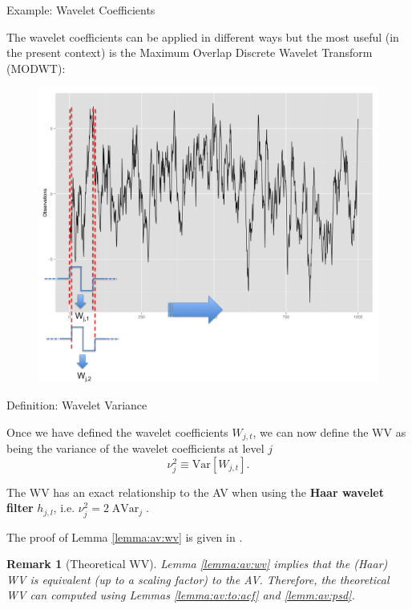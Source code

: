 \documentclass[envcountsect,usenames,dvipsnames]{beamer}
\DeclareMathOperator{\AV}{AVar}
\theoremstyle{mystyle}
\newtheorem{Remark}{Remark}
\begin{document}
\begin{frame}{Example: Wavelet Coefficients}

The wavelet coefficients can be applied in different ways but the most useful (in the present context) is the Maximum Overlap Discrete Wavelet Transform (MODWT):

\begin{figure}
    \centering
  \includegraphics[scale = 0.26]{Images/modwt.png}
\end{figure}

\end{frame}

\begin{frame}{Definition: Wavelet Variance}

\begin{Definition}
\label{def:WV}
\small
Once we have defined the wavelet coefficients $W_{j,t}$, we can now define the WV as being the variance of the wavelet coefficients at level $j$
	\begin{equation*}
	 \nu_{j}^2 \equiv \text{Var}[W_{j,t}].
	 \end{equation*}
\end{Definition}

\begin{Lemma}
\label{lemma:av:wv}
\small
The WV has an exact relationship to the AV when using the \textbf{Haar wavelet filter} $h_{j,l}$, i.e. $\nu_{j}^2 = 2 \AV_j$.
\end{Lemma}

\vspace{0.25cm}

The proof of Lemma \ref{lemma:av:wv} is given in \cite{percival1994long}.

\begin{Remark}[Theoretical WV]
	\small
Lemma \ref{lemma:av:wv} implies that the (Haar) WV is equivalent (up to a scaling factor) to the AV. Therefore, the theoretical WV can computed using Lemmas \ref{lemma:av:to:acf} and \ref{lemm:av:psd}.
\end{Remark}

\end{frame}
\end{document}
